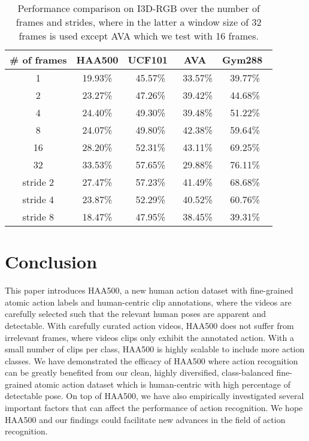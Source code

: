 \documentclass[10pt,twocolumn,letterpaper]{article}
\begin{document}
\begin{table}[t]
{\small 
\begin{center}
\begin{tabular}{|c|c|c|c|c|}
\hline
 \# of frames & HAA500 & UCF101~\cite{ucf101} & AVA~\cite{AVA} & Gym288~\cite{finegym} \\
\hline
1  & 19.93\% & 45.57\% & 33.57\% & 39.77\%\\
2  & 23.27\% & 47.26\% & 39.42\% & 44.68\%\\
4  & 24.40\% & 49.30\% & 39.48\% & 51.22\%\\
8  & 24.07\% & 49.80\% & 42.38\% & 59.64\%\\
16 & 28.20\% & 52.31\% & 43.11\% & 69.25\% \\
32 & 33.53\% & 57.65\% & 29.88\% & 76.11\% \\
\hline
stride 2 & 27.47\% & 57.23\%  & 41.49\% & 68.68\%\\
stride 4 & 23.87\% & 52.29\%  & 40.52\% & 60.76\%\\
stride 8 & 18.47\% & 47.95\%  & 38.45\% & 39.31\%\\
\hline
\end{tabular}
\end{center}}
\caption{Performance comparison on I3D-RGB over the number of frames and strides, where in the latter a window size of 32 frames is used except AVA which we test with 16 frames.}
\label{table:action_oriented}
\end{table}

\section{Conclusion}

This paper introduces HAA500, a new human action dataset with fine-grained atomic action labels and human-centric clip annotations, where the videos are carefully selected such that the relevant human poses are apparent and detectable. With carefully curated action videos, HAA500 does not suffer from irrelevant frames, where videos clips only exhibit the annotated action. With a small number of clips per class, HAA500 is highly scalable to include more action classes. We have demonstrated the efficacy of HAA500 where action recognition can be greatly benefited from our clean, highly diversified, class-balanced fine-grained atomic action dataset which is human-centric with high percentage of detectable pose. On top of HAA500, we have also empirically investigated several important factors that can affect the performance of action recognition. We hope HAA500 and our findings could facilitate new advances in the field of action recognition.

{\small


}
\end{document}
